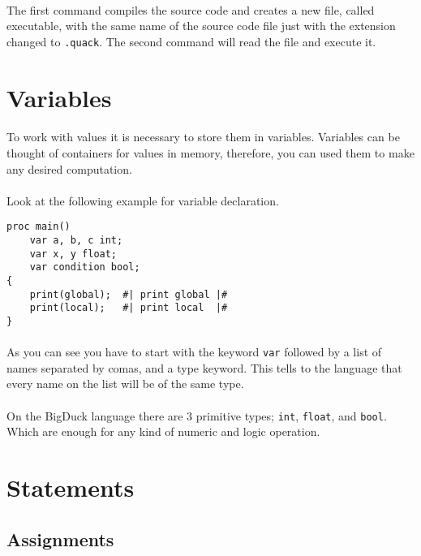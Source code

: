 \paragraph{} The first command compiles the source code and creates a new file,
called executable, with the same name of the source code file just with the
extension changed to \texttt{.quack}. The second command will read the file
and execute it.

\section{Variables}
\paragraph{} To work with values it is necessary to store them in variables.
Variables can be thought of containers for values in memory, therefore, you
can used them to make any desired computation.

\paragraph{} Look at the following example for variable declaration.
\begin{verbatim}
proc main()
    var a, b, c int;
    var x, y float;
    var condition bool;
{
    print(global);  #| print global |#
    print(local);   #| print local  |#
}
\end{verbatim}

\paragraph{} As you can see you have to start with the keyword \texttt{var}
followed by a list of names separated by comas, and a type keyword. This tells
to the language that every name on the list will be of the same type.

\paragraph{} On the BigDuck language there are 3 primitive types; \texttt{int},
\texttt{float}, and \texttt{bool}. Which are enough for any kind of numeric
and logic operation.

\section{Statements}
\subsection{Assignments}
